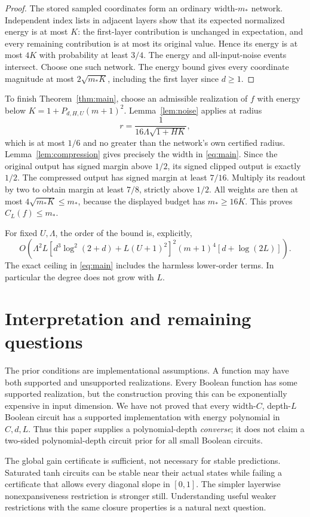 \documentclass[11pt]{article}
\theoremstyle{remark}\newtheorem{remark}[theorem]{Remark}
\begin{document}
\begin{proof}
The stored sampled coordinates form an ordinary width-$m_*$ network.
Independent index lists in adjacent layers show that its expected
normalized energy is at most $K$: the first-layer contribution is
unchanged in expectation, and every remaining contribution is at most
its original value. Hence its energy is at most $4K$ with probability
at least $3/4$. The energy and all-input-noise events intersect. Choose
one such network. The energy bound gives every coordinate magnitude at
most $2\sqrt{m_*K}$, including the first layer since $d\ge1$.
\end{proof}

To finish Theorem~\ref{thm:main}, choose an admissible realization of $f$
with energy below $K=1+P_{d,H,U}(m+1)^2$. Lemma~\ref{lem:noise} applies
at radius
\[
 r=\frac1{16\Lambda\sqrt{1+HK}},
\]
which is at most $1/6$ and no greater than the network's own certified
radius. Lemma~\ref{lem:compression} gives precisely the width in
\eqref{eq:main}. Since the original output has signed margin above
$1/2$, its signed clipped output is exactly $1/2$. The compressed output
has signed margin at least $7/16$. Multiply its readout by two to obtain
margin at least $7/8$, strictly above $1/2$. All weights are then at most
$4\sqrt{m_*K}\le m_*$, because the displayed budget has $m_*\ge16K$.
This proves $C_L(f)\le m_*$.

For fixed $U,\Lambda$, the order of the bound is, explicitly,
\[
 O\!\left(\Lambda^2 L
 [d^3\log^2(2+d)+L(U+1)^2]^2
 (m+1)^4[d+\log(2L)]\right).
\]
The exact ceiling in \eqref{eq:main} includes the harmless lower-order
terms. In particular the degree does not grow with $L$.

\section{Interpretation and remaining questions}
The prior conditions are implementational assumptions. A function may
have both supported and unsupported realizations. Every Boolean function
has some supported realization, but the construction proving this can be
exponentially expensive in input dimension. We have not proved that every
width-$C$, depth-$L$ Boolean circuit has a supported implementation with
energy polynomial in $C,d,L$. Thus this paper supplies a polynomial-depth
\emph{converse}; it does not claim a two-sided polynomial-depth circuit
prior for all small Boolean circuits.

The global gain certificate is sufficient, not necessary for stable
predictions. Saturated tanh circuits can be stable near their actual
states while failing a certificate that allows every diagonal slope in
$[0,1]$. The simpler layerwise nonexpansiveness restriction is stronger
still. Understanding useful weaker restrictions with the same closure
properties is a natural next question.
\end{document}
